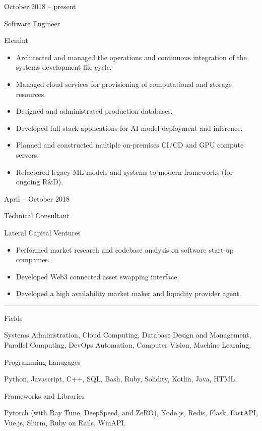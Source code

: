 \documentclass[a4paper,10pt]{article}
\newlength{\cvcolumngapwidth}
\newlength{\cvleftcolumnwidth}
\newlength{\cvrightcolumnwidth}
\newcommand{\cvsectionstyle}[1]{{\normalsize\cvsectionfont\textcolor{cvsectioncolor}{#1}}}
\newcommand{\cvtitlestyle}[1]{{\large\cvtitlefont\textcolor{cvtitlecolor}{#1}}}
\newcommand{\cvdurationstyle}[1]{{\small\cvdurationfont\textcolor{cvdurationcolor}{#1}}}
\newcommand{\cvheadingstyle}[1]{{\normalsize\cvheadingfont\textcolor{cvheadingcolor}{#1}}}
\newlength{\cvafteritemskipamount}
\newlength{\cvaftersectionskipamount}
\newlength{\cvbetweensectionandheadingextraskipamount}
\newlength{\cvaftertitleskipamount}
\newlength{\cvparskip}
\newcommand{\cvsection}[1]{
    \begin{minipage}[t]{\cvleftcolumnwidth}
        \raggedleft\cvsectionstyle{#1}
    \end{minipage}%
    \hspace{\cvcolumngapwidth}%
    \begin{minipage}[t]{\cvrightcolumnwidth}
        \textcolor{cvrulecolor}{\rule{\cvrightcolumnwidth}{0.3mm}}
    \end{minipage}

    \vspace{\cvaftersectionskipamount}
}
\newcommand{\cvitem}[2]{
    \begin{minipage}[t]{\cvleftcolumnwidth}
        \raggedleft #1
    \end{minipage}%
    \hspace{\cvcolumngapwidth}%
    \begin{minipage}[t]{\cvrightcolumnwidth}
        \setlength{\parskip}{\cvparskip} #2
    \end{minipage}

    \vspace{\cvafteritemskipamount}
}
\newcommand{\cvtitle}[1]{
    \cvtitlestyle{#1}

    \vspace{\cvaftertitleskipamount}
    \vspace{-\cvparskip}
}
\begin{document}
\cvitem{
    \cvdurationstyle{October 2018 -- present}
}{
    \cvtitle{Software Engineer}

    Elemint

    \begin{itemize}[leftmargin=*]
        \item Architected and managed the operations and continuous integration of the systems development life cycle.
        \item Managed cloud services for provisioning of computational and storage resources.
        \item Designed and administrated production databases.
        \item Developed full stack applications for AI model deployment and inference.
        \item Planned and constructed multiple on-premises CI/CD and GPU compute servers.
        \item Refactored legacy ML models and systems to modern frameworks (for ongoing R\&D).
    \end{itemize}
}

\cvitem{
    \cvdurationstyle{April -- October 2018}
}{
    \cvtitle{Technical Consultant}

    Lateral Capital Ventures

    \begin{itemize}[leftmargin=*]
        \item Performed market research and codebase analysis on software start-up companies.
        \item Developed Web3 connected asset swapping interface.
        \item Developed a high availability market maker and liquidity provider agent.
    \end{itemize}
}


\cvsection{SKILLS}

\vspace{\cvbetweensectionandheadingextraskipamount}

\cvitem{
    \cvheadingstyle{Fields}
}{
    Systems Administration, Cloud Computing, Database Design and Management, Parallel Computing, DevOps Automation, Computer Vision, Machine Learning.
}

\cvitem{
    \cvheadingstyle{Programming Lanugages}
}{
    Python, Javascript, C++, SQL, Bash, Ruby, Solidity, Kotlin, Java, HTML.
}

\cvitem{
    \cvheadingstyle{Frameworks and Libraries}
}{
    Pytorch (with Ray Tune, DeepSpeed, and ZeRO), Node.js, Redis, Flask, FastAPI, Vue.js, Slurm, Ruby on Rails, WinAPI.
}
\end{document}
